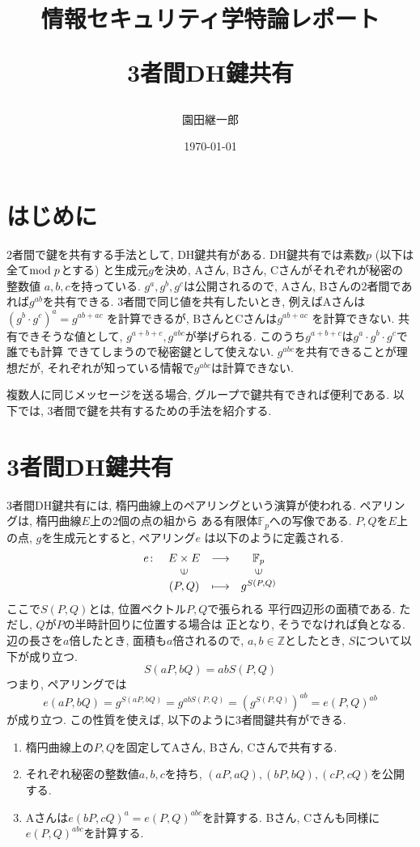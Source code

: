 \documentclass[a4paper,11pt]{jsarticle}
\begin{document}
\title{情報セキュリティ学特論レポート

3者間DH鍵共有}
\author{園田継一郎}
\date{\today}
\maketitle

\section{はじめに}
2者間で鍵を共有する手法として, DH鍵共有がある.
DH鍵共有では素数$p$ (以下は全て${\rm mod}\hspace{3pt} p$とする)
と生成元$g$を決め, 
Aさん, Bさん, Cさんがそれぞれが秘密の整数値
$a, b, c$を持っている.
$g^a, g^b, g^c$は公開されるので, 
Aさん, Bさんの2者間であれば$g^{ab}$を共有できる.
3者間で同じ値を共有したいとき,
例えばAさんは$(g^b \cdot g^c)^a = g^{ab + ac}$
を計算できるが, BさんとCさんは$g^{ab + ac}$
を計算できない.
共有できそうな値として, $g^{a + b + c}, g^{abc}$が挙げられる.
このうち$g^{a + b + c}$は$g^a \cdot g^b \cdot g^c$で誰でも計算
できてしまうので秘密鍵として使えない.
$g^{abc}$を共有できることが理想だが, 
それぞれが知っている情報で$g^{abc}$は計算できない.

複数人に同じメッセージを送る場合,
グループで鍵共有できれば便利である.
以下では, 3者間で鍵を共有するための手法を紹介する.

\section{3者間DH鍵共有}
3者間DH鍵共有には, 楕円曲線上のペアリングという演算が使われる.
ペアリングは, 楕円曲線$E$上の2個の点の組から
ある有限体$\mathbb{F}_p$への写像である\cite{bib1}.
$P, Q$を$E$上の点, $g$を生成元とすると, ペアリング$e$
は以下のように定義される.
\[
  \begin{array}{rccc}
    e \colon & E \times E & \longrightarrow & \mathbb{F}_p \\
            & \rotatebox{90}{$\in$} & & \rotatebox{90}{$\in$} \\
            & (P, Q) & \longmapsto & g^{S(P, Q)}
  \end{array}
\]
ここで$S(P, Q)$とは, 位置ベクトル$P, Q$で張られる
平行四辺形の面積である. ただし, $Q$が$P$の半時計回りに位置する場合は
正となり, そうでなければ負となる. 辺の長さを$a$倍したとき, 
面積も$a$倍されるので, $a, b \in \mathbb{Z}$としたとき, 
$S$について以下が成り立つ. 
\[
  S(aP, bQ) = abS(P, Q)
\]
つまり, ペアリングでは
\[
  e(aP, bQ) = g^{S(aP, bQ)} = g^{abS(P, Q)} =
  \left(g^{S(P, Q)}\right)^{ab} = e(P, Q)^{ab}
\]
が成り立つ. この性質を使えば, 以下のように3者間鍵共有ができる.
\begin{enumerate}
  \item 楕円曲線上の$P, Q$を固定してAさん, Bさん, Cさんで共有する.
  \item それぞれ秘密の整数値$a, b, c$を持ち, $(aP, aQ), (bP, bQ), (cP, cQ)$を公開する.
  \item Aさんは$e(bP, cQ)^a = e(P, Q)^{abc}$を計算する.
    Bさん, Cさんも同様に$e(P, Q)^{abc}$を計算する.
\end{enumerate}
\end{document}

